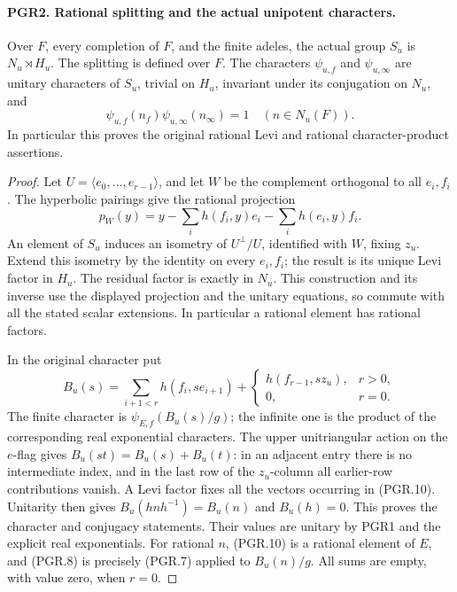 \paragraph{PGR2. Rational splitting and the actual unipotent characters.}
\label{claim:PGR2}
Over \(F\), every completion of \(F\), and the finite adeles,
the actual group \(S_u\) is \(N_u\rtimes H_u\).  The splitting
is defined over \(F\).  The characters \(\psi_{u,f}\) and
\(\psi_{u,\infty}\) are unitary characters of \(S_u\), trivial
on \(H_u\), invariant under its conjugation on \(N_u\), and
\[
       \psi_{u,f}(n_f)\psi_{u,\infty}(n_\infty)=1
                           \quad(n\in N_u(F)).
\tag{PGR.8}
\]
In particular this proves the original rational Levi and rational
character-product assertions.
\begin{proof}
Let \(U=\langle e_0,\ldots,e_{r-1}\rangle\), and let \(W\)
be the complement orthogonal to all \(e_i,f_i\).  The hyperbolic
pairings give the rational projection
\[
 p_W(y)=y-\sum_i h(f_i,y)e_i-\sum_i h(e_i,y)f_i.
\tag{PGR.9}
\]
An element of \(S_u\) induces an isometry of \(U^\perp/U\),
identified with \(W\), fixing \(z_u\).  Extend this isometry
by the identity on every \(e_i,f_i\); the result is its unique
Levi factor in \(H_u\).  The residual factor is exactly in
\(N_u\).  This construction and its inverse use the displayed
projection and the unitary equations, so commute with all the stated
scalar extensions.  In particular a rational element has rational
factors.

In the original character put
\[
 B_u(s)=\sum_{i+1<r}h(f_i,se_{i+1})+
             \begin{cases}h(f_{r-1},sz_u),&r>0,\\0,&r=0.\end{cases}
\tag{PGR.10}
\]
The finite character is \(\psi_{E,f}(B_u(s)/g)\); the infinite
one is the product of the corresponding real exponential characters.
The upper unitriangular action on the \(e\)-flag gives
\(B_u(st)=B_u(s)+B_u(t)\): in an adjacent entry there is no
intermediate index, and in the last row of the \(z_u\)-column
all earlier-row contributions vanish.  A Levi factor fixes all the
vectors occurring in (PGR.10).  Unitarity then gives
\(B_u(hnh^{-1})=B_u(n)\) and \(B_u(h)=0\).
This proves the character and conjugacy statements.  Their values
are unitary by PGR1 and the explicit real exponentials.
For rational \(n\), (PGR.10) is a rational element of \(E\),
and (PGR.8) is precisely (PGR.7) applied to \(B_u(n)/g\).
All sums are empty, with value zero, when \(r=0\).
\end{proof}

